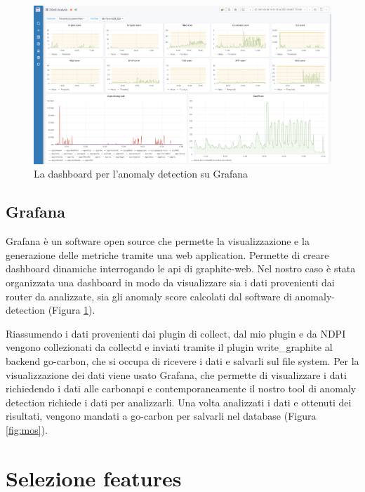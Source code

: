 \begin{figure}[h]
    \includegraphics[width=\hsize]{images/my_work/grafana_dashboard.png}
    \caption{La dashboard per l'anomaly detection su Grafana}
    \label{fig:grafana}
    \centering
\end{figure}

\subsection{Grafana}
Grafana è un software open source che permette la visualizzazione e la generazione delle metriche tramite una web application. Permette di creare dashboard dinamiche interrogando le api di graphite-web. Nel nostro caso è stata organizzata una dashboard in modo da visualizzare sia i dati provenienti dai router da analizzate, sia gli anomaly score calcolati dal software di anomaly-detection (Figura \ref{fig:grafana}).


Riassumendo i dati provenienti dai plugin di collect, dal mio plugin e da NDPI vengono collezionati da collectd e inviati tramite il plugin write\_graphite al backend go-carbon, che si occupa di ricevere i dati e salvarli sul file system. Per la visualizzazione dei dati viene usato Grafana, che permette di visualizzare i dati richiedendo i dati alle carbonapi e contemporaneamente il nostro tool di anomaly detection richiede i dati per analizzarli. Una volta analizzati i dati e ottenuti dei risultati, vengono mandati a go-carbon per salvarli nel database (Figura \ref{fig:mos}).


\section{Selezione features}

